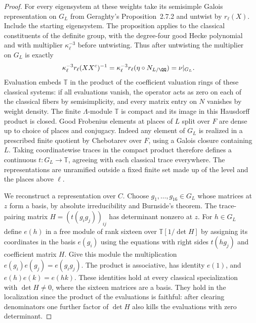 \documentclass[a4paper,11pt]{article}
\theoremstyle{definition}
\theoremstyle{remark}
\numberwithin{equation}{section}
\begin{document}
\begin{proof}
For every eigensystem at these weights take its semisimple
Galois representation on \(G_L\) from Geraghty's
Proposition~2.7.2 and untwist by \(r_\ell(X)\). Include
the starting eigensystem. The proposition applies to the
classical constituents of the definite group, with the
degree-four good Hecke polynomial and with multiplier
\(\kappa_\ell^{-3}\) before untwisting. Thus after untwisting
the multiplier on \(G_L\) is exactly
\[
   \kappa_\ell^{-3}r_\ell(XX^c)^{-1}
        =\kappa_\ell^{-3}r_\ell(\eta\circ N_{L/\QQ})
        =\nu|_{G_L}.
\]
Evaluation embeds \(\mathbb T\) in the product of the
coefficient valuation rings of these classical systems:
if all evaluations vanish, the operator acts as zero on
each of the classical fibers by semisimplicity, and every
matrix entry on \(N\) vanishes by weight density. The finite
\(\Lambda\)-module \(\mathbb T\) is compact and its image in
this Hausdorff product is closed. Good Frobenius elements
at places of \(L\) split over \(F\) are dense up to choice
of places and conjugacy. Indeed any element of \(G_L\) is
realized in a prescribed finite quotient by Chebotarev over
\(F\), using a Galois closure containing \(L\). Taking
coordinatewise traces in the compact product therefore
defines a continuous \(t:G_L\to\mathbb T\), agreeing with
each classical trace everywhere. The representations are
unramified outside a fixed finite set made up of the level
and the places above \(\ell\). \cite{XII-IX-geraghty363}

We reconstruct a representation over \(C\). Choose
\(g_1,\ldots,g_{16}\in G_L\) whose matrices at \(z\)
form a basis, by absolute irreducibility and Burnside's
theorem. The trace-pairing matrix \(H=(t(g_i g_j))_{ij}\)
has determinant nonzero at \(z\). For \(h\in G_L\) define
\(e(h)\) in a free module of rank sixteen over
\(\mathbb T[1/\det H]\) by assigning its coordinates in
the basis \(e(g_i)\) using the equations with right sides
\(t(hg_j)\) and coefficient matrix \(H\). Give this
module the multiplication \(e(g_i)e(g_j)=e(g_i g_j)\).
The product is associative, has identity \(e(1)\), and
\(e(h)e(k)=e(hk)\). These identities hold at every
classical specialization with \(\det H\ne0\), where the
sixteen matrices are a basis. They hold in the localization
since the product of the evaluations is faithful: after
clearing denominators one further factor of \(\det H\)
also kills the evaluations with zero determinant.


\end{proof}
\end{document}
